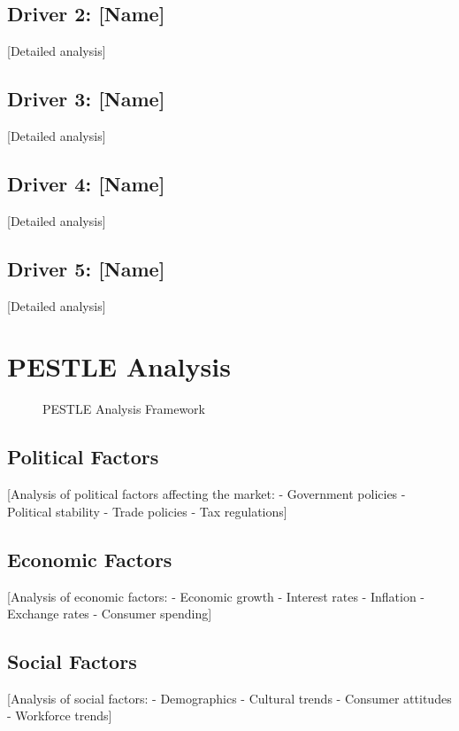 \documentclass[11pt,letterpaper]{report}
\begin{document}
\subsection{Driver 2: [Name]}
[Detailed analysis]

\subsection{Driver 3: [Name]}
[Detailed analysis]

\subsection{Driver 4: [Name]}
[Detailed analysis]

\subsection{Driver 5: [Name]}
[Detailed analysis]

\section{PESTLE Analysis}


\begin{figure}[htbp]
\centering
\caption{PESTLE Analysis Framework}
\label{fig:pestle}
\end{figure}

\subsection{Political Factors}
[Analysis of political factors affecting the market:
- Government policies
- Political stability
- Trade policies
- Tax regulations]

\subsection{Economic Factors}
[Analysis of economic factors:
- Economic growth
- Interest rates
- Inflation
- Exchange rates
- Consumer spending]

\subsection{Social Factors}
[Analysis of social factors:
- Demographics
- Cultural trends
- Consumer attitudes
- Workforce trends]
\end{document}
